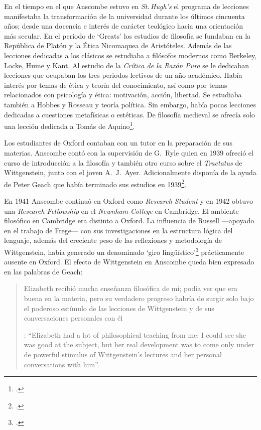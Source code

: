 En el tiempo en el que Anscombe estuvo en \emph{St.\,Hugh's} el programa de lecciones manifestaba la transformación de la universidad durante los últimos cincuenta años; desde una docencia e interés de carácter teológico hacia una orientación más secular. En el periodo de `Greats' los estudios de filosofía se fundaban en la República de Platón y la Ética Nicomaquea de Aristóteles. Además de las lecciones dedicadas a los clásicos se estudiaba a filósofos modernos como Berkeley, Locke, Hume y Kant. Al estudio de la \emph{Crítica de la Razón Pura} se le dedicaban lecciones que ocupaban los tres periodos lectivos de un año académico. Había interés por temas de ética y teoría del conocimiento, así como por temas relacionados con psicología y ética: motivación, acción, libertad. Se estudiaba también a Hobbes y Rosseau y teoría política. Sin embargo, había pocas lecciones dedicadas a cuestiones metafísicas o estéticas. De filosofía medieval se ofrecía solo una lección dedicada a Tomás de Aquino\footcite[Cf.][23-24]{torralba2005accion}.

Los estudiantes de Oxford contaban con un tutor en la preparación de sus materias. Anscombe contó con la supervisión de G.~Ryle quien en 1939 ofreció el curso de introducción a la filosofía y también otro curso sobre el \emph{Tractatus} de Wittgenstein, junto con el joven A.~J.~Ayer. Adicionalmente disponía de la ayuda de Peter Geach que había terminado sus estudios en 1939\footcite[Cf.][24]{torralba2005accion}.

En 1941 Anscombe continuó en Oxford como \emph{Research Student} y en 1942 obtuvo una \emph{Research Fellowship} en el \emph{Newnham College} en Cambridge. El ambiente filosófico en Cambridge era distinto a Oxford. La influencia de Russell ---apoyado en el trabajo de Frege--- con sus investigaciones en la estructura lógica del lenguaje, además del creciente peso de las reflexiones y metodología de Wittgenstein, había generado un denominado `giro lingüístico'\footcite[Cf.][14]{geach1991philaut} prácticamente ausente en Oxford. El efecto de Wittgenstein en Anscombe queda bien expresado en las palabras de Geach: \blockquote[{\Cite[11]{geach1991philaut}}: \enquote{Elizabeth had a lot of philosophical teaching from me; I could see she was good at the subject, but her real development was to come only under de powerful stimulus of Wittgenstein's lectures and her personal conversations with him}.]{Elizabeth recibió mucha enseñanza filosófica de mí; podía ver que era buena en la materia, pero su verdadero progreso habría de surgir solo bajo el poderoso estímulo de las lecciones de Wittgenstein y de sus conversaciones personales con él}.

